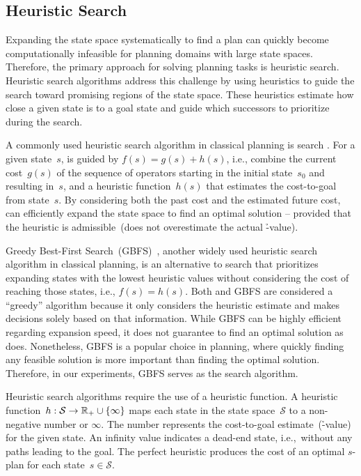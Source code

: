 \subsection{Heuristic Search}
\label{sec:heuristic-search}

Expanding the state space systematically to find a plan can quickly become computationally infeasible for planning domains with large state spaces. Therefore, the primary approach for solving planning tasks is heuristic search. Heuristic search algorithms address this challenge by using heuristics to guide the search toward promising regions of the state space. These heuristics estimate how close a given state is to a goal state and guide which successors to prioritize during the search.

A commonly used heuristic search algorithm in classical planning is \astar search \cite{hart1968formal}. For a given state~$s$, \astar is guided by $f(s)=g(s)+h(s)$, i.e., combine the current cost~$g(s)$ of the sequence of operators starting in the initial state~$s_0$ and resulting in~$s$, and a heuristic function~$h(s)$ that estimates the cost-to-goal from state~$s$. By considering both the past cost and the estimated future cost, \astar can efficiently expand the state space to find an optimal solution -- provided that the heuristic is admissible~(does not overestimate the actual \h-value).

Greedy Best-First Search~(GBFS)~\cite{doran1966experiments}, another widely used heuristic search algorithm in classical planning, is an alternative to \astar search that prioritizes expanding states with the lowest heuristic values without considering the cost of reaching those states, i.e., $f(s)=h(s)$. Both \astar and GBFS are considered a ``greedy'' algorithm because it only considers the heuristic estimate and makes decisions solely based on that information. While GBFS can be highly efficient regarding expansion speed, it does not guarantee to find an optimal solution as \astar does. Nonetheless, GBFS is a popular choice in planning, where quickly finding any feasible solution is more important than finding the optimal solution. Therefore, in our experiments, GBFS serves as the search algorithm.

Heuristic search algorithms require the use of a heuristic function. A heuristic function~$h:\mathcal{S}\rightarrow\mathbb{R}_{+}\cup\{\infty\}$ maps each state in the state space~$\mathcal{S}$ to a non-negative number or $\infty$. The number represents the cost-to-goal estimate~(\h-value) for the given state. An infinity value indicates a dead-end state, i.e.,~without any paths leading to the goal. The perfect heuristic \hstar produces the cost of an optimal $s$-plan for each state~$s \in \mathcal{S}$.

